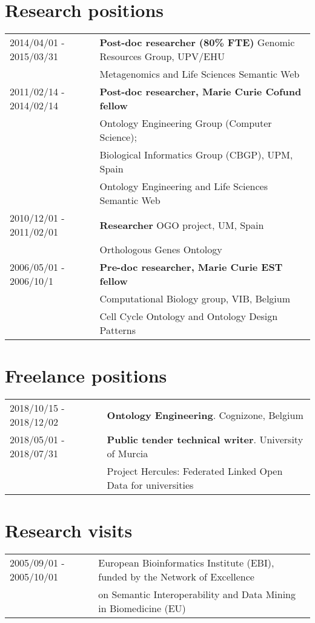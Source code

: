 \documentclass[11pt,fullpage]{article}
\begin{document}
\section*{Research positions}
\begin{tabular}{ll}
2014/04/01 - 2015/03/31 & {\bf Post-doc researcher (80\% FTE)} Genomic Resources Group, UPV/EHU  \\
   & Metagenomics and Life Sciences Semantic Web \\
2011/02/14 - 2014/02/14 & {\bf Post-doc researcher, Marie Curie Cofund fellow} \\
     & Ontology Engineering Group (Computer Science); \\
     & Biological Informatics Group (CBGP), UPM, Spain \\
     & Ontology Engineering and Life Sciences Semantic Web \\
2010/12/01 - 2011/02/01 & {\bf Researcher} OGO project, UM, Spain \\
     & Orthologous Genes Ontology \\
2006/05/01 - 2006/10/1 & {\bf Pre-doc researcher, Marie Curie EST fellow} \\
    & Computational Biology group, VIB, Belgium \\
    & Cell Cycle Ontology and Ontology Design Patterns \\
\end{tabular}

\section*{Freelance positions}
\begin{tabular}{ll}

2018/10/15 - 2018/12/02 & {\bf Ontology Engineering}. Cognizone, Belgium\\
2018/05/01 - 2018/07/31 & {\bf Public tender technical writer}. University of Murcia \\
        &  Project Hercules: Federated Linked Open Data for universities\\
\end{tabular}

\section*{Research visits}

\begin{tabular}{ll}
 2005/09/01 - 2005/10/01 & European Bioinformatics Institute (EBI), funded by the Network of Excellence \\
      & on Semantic Interoperability and Data Mining in Biomedicine (EU)

\end{tabular}
\end{document}
